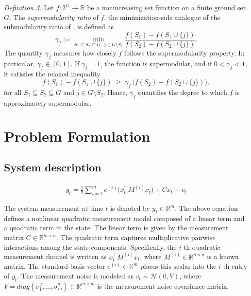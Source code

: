 \documentclass[letterpaper, 10 pt, conference]{ieeeconf}  %
\begin{document}
\noindent \textit{Definition 3.}
Let \(f:2^{G}\to\mathbb R\) be a nonincreasing set function on a finite ground set \(G\).
The \emph{supermodularity ratio} of \(f\), the minimization-side analogue of the submodularity ratio of \cite{c26}, is defined as
\[
\gamma_f
:=
\min_{S_1 \subseteq S_2 \subseteq G,\; j\in G\setminus S_2}
\frac{f(S_1)-f(S_1\cup\{j\})}
     {f(S_2)-f(S_2\cup\{j\})}.
\]
The quantity \(\gamma_f\) measures how closely \(f\) follows the supermodularity property. In particular, \(\gamma_f\in[0,1]\). If \(\gamma_f=1\), the function is supermodular, and if \(0<\gamma_f<1\), it satisfies the relaxed inequality
\[
f(S_1)-f(S_1\cup\{j\})
\;\ge\;
\gamma_f\,\bigl(f(S_2)-f(S_2 \cup\{j\})\bigr),
\]
for all \(S_1 \subseteq S_2 \subseteq G\) and \(j\in G\setminus S_2\). Hence, \(\gamma_f\) quantifies the degree to which \(f\) is approximately supermodular. \\

\section{Problem Formulation}

\subsection{System description}
\begin{equation}
\begin{aligned}
y_t = \frac{1}{2}\sum_{i=1}^m e^{(i)}\big(x_t^\top M^{(i)}x_t\big)+Cx_t + v_t 
\end{aligned}
\end{equation}

\vspace{2pt}

The system measurement at time \(t\) is denoted by \(y_t \in \mathbb{R}^{m}\). The above equation defines a nonlinear quadratic measurement model composed of a linear term and a quadratic term in the state. The linear term is given by the measurement matrix \(C \in \mathbb{R}^{m \times n}\). The quadratic term captures multiplicative pairwise interactions among the state components. Specifically, the \(i\)-th quadratic measurement channel is written as \(x_t^\top M^{(i)} x_t\), where \(M^{(i)} \in \mathbb{R}^{n \times n}\) is a known matrix. The standard basis vector \(e^{(i)} \in \mathbb{R}^m\) places this scalar into the \(i\)-th entry of \(y_t\). The measurement noise is modeled as \(v_t \sim \mathcal{N}(0,V)\), where \(V = diag(\sigma^2_1, \dots, \sigma^2_m ) \in \mathbb{R}^{m \times m}\) is the measurement noise covariance matrix.
\end{document}
